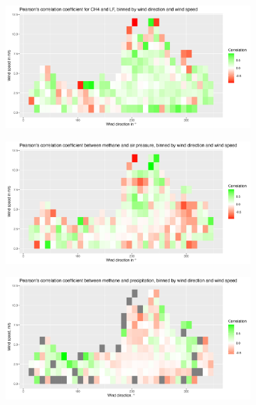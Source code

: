 \begin{figure}[!htb]
\centering
\begin{subfigure}[b]{0.8\textwidth}
   \includegraphics[width=1\linewidth]{figures/Appendix/NoCorrelation/13_CH4_vs_Conductivity_Correlation_Geomatikum.png}
   \caption[NCorrelation plot conductivity in Elbe water]{}
   \label{NoCorrelationConductivity} 
\end{subfigure}
\begin{subfigure}[b]{0.8\textwidth}
   \includegraphics[width=1\linewidth]{figures/Appendix/NoCorrelation/13_CH4_vs_pressure_Correlation_Geomatikum.png}
   \caption[Correlation plot air pressure]{}
   \label{NoCorrelationPressure}
\end{subfigure}
\begin{subfigure}[b]{0.8\textwidth}
   \includegraphics[width=1\linewidth]{figures/Appendix/NoCorrelation/13_CH4_vs_precipitation_height_Correlation_Geomatikum.png}

\end{subfigure}
\end{figure}
